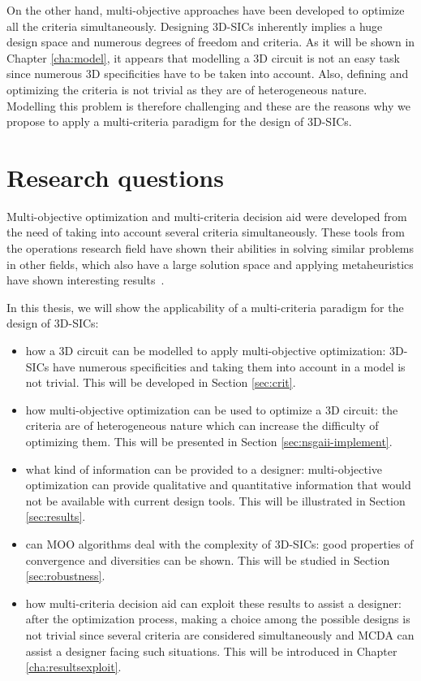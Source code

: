 On the other hand, multi-objective approaches have been developed to optimize all the criteria simultaneously. Designing 3D-SICs inherently implies a huge design space and numerous degrees of freedom and criteria. As it will be shown in Chapter \ref{cha:model}, it appears that modelling a 3D circuit is not an easy task since numerous 3D specificities have to be taken into account. Also, defining and optimizing the criteria is not trivial as they are of heterogeneous nature. Modelling this problem is therefore challenging and these are the reasons why we propose to apply a multi-criteria paradigm for the design of 3D-SICs.

\section*{Research questions}
Multi-objective optimization and multi-criteria decision aid were developed from the need of taking into account several criteria simultaneously. These tools from the operations research field have shown their abilities in solving similar problems in other fields, which also have a large solution space and applying metaheuristics have shown interesting results~\cite{talbi09}.

In this thesis, we will show the applicability of a multi-criteria paradigm for the design of 3D-SICs:
\begin{itemize}
\item how a 3D circuit can be modelled to apply multi-objective optimization: 3D-SICs have numerous specificities and taking them into account in a model is not trivial. This will be developed in Section \ref{sec:crit}.
\item how multi-objective optimization can be used to optimize a 3D circuit: the criteria are of heterogeneous nature which can increase the difficulty of optimizing them. This will be presented in Section \ref{sec:nsgaii-implement}.
\item what kind of information can be provided to a designer: multi-objective optimization can provide qualitative and quantitative information that would not be available with current design tools. This will be illustrated in Section \ref{sec:results}.
\item can MOO algorithms deal with the complexity of 3D-SICs: good properties of convergence and diversities can be shown. This will be studied in Section \ref{sec:robustness}.
\item how multi-criteria decision aid can exploit these results to assist a designer: after the optimization process, making a choice among the possible designs is not trivial since several criteria are considered simultaneously and MCDA can assist a designer facing such situations. This will be introduced in Chapter \ref{cha:resultsexploit}.
\end{itemize}

